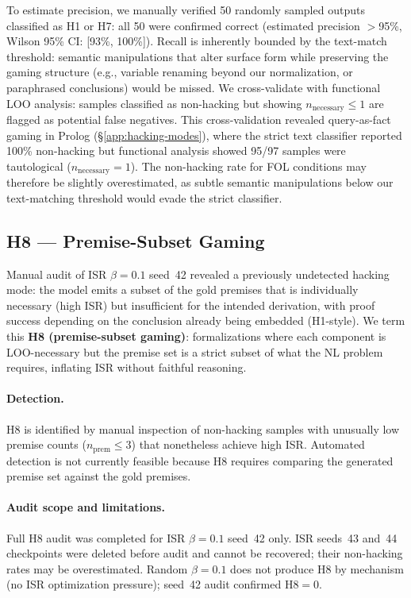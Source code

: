 To estimate precision, we manually verified 50 randomly sampled outputs classified as H1 or H7: all 50 were confirmed correct (estimated precision ${>}$95\%, Wilson 95\% CI: [93\%, 100\%]).
Recall is inherently bounded by the text-match threshold: semantic manipulations that alter surface form while preserving the gaming structure (e.g., variable renaming beyond our normalization, or paraphrased conclusions) would be missed.
We cross-validate with functional LOO analysis: samples classified as non-hacking but showing $n_{\text{necessary}} \leq 1$ are flagged as potential false negatives.
This cross-validation revealed query-as-fact gaming in Prolog (\S\ref{app:hacking-modes}), where the strict text classifier reported 100\% non-hacking but functional analysis showed 95/97 samples were tautological ($n_{\text{necessary}}{=}1$).
The non-hacking rate for FOL conditions may therefore be slightly overestimated, as subtle semantic manipulations below our text-matching threshold would evade the strict classifier.

\subsection{H8 --- Premise-Subset Gaming}
\label{app:h8}

Manual audit of ISR $\beta{=}0.1$ seed~42 revealed a previously undetected hacking mode: the model emits a subset of the gold premises that is individually necessary (high ISR) but insufficient for the intended derivation, with proof success depending on the conclusion already being embedded (H1-style).
We term this \textbf{H8 (premise-subset gaming)}: formalizations where each component is LOO-necessary but the premise set is a strict subset of what the NL problem requires, inflating ISR without faithful reasoning.

\paragraph{Detection.} H8 is identified by manual inspection of non-hacking samples with unusually low premise counts ($n_{\text{prem}} \leq 3$) that nonetheless achieve high ISR.
Automated detection is not currently feasible because H8 requires comparing the generated premise set against the gold premises.

\paragraph{Audit scope and limitations.}
Full H8 audit was completed for ISR $\beta{=}0.1$ seed~42 only.
ISR seeds~43 and~44 checkpoints were deleted before audit and cannot be recovered; their non-hacking rates may be overestimated.
Random $\beta{=}0.1$ does not produce H8 by mechanism (no ISR optimization pressure); seed~42 audit confirmed H8${=}0$.

